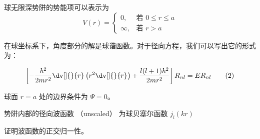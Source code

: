 
\begin{issues}
\issueDraft
\end{issues}


球无限深势阱的势能项可以表示为
$$
V(r)=
\begin{cases}
0,  & \text{若 $0\leq r\leq a$} \\
\infty, & \text{若 $r>a$}
\end{cases}
$$

在球坐标系下，角度部分的解是球谐函数。对于径向方程，我们可以写出它的形式为：

\begin{equation}
\left[-\frac{\hbar^2}{2mr^2} \dv[]{}{r}\left(r^2\dv[]{}{r}\right) + \frac{l(l + 1)\hbar^2}{2mr^2}\right]R_{nl} = ER_{nl}\tag{2}
\end{equation}

球面 $r = a$ 处的边界条件为 $\Psi = 0$。

势阱内部的径向波函数 （unscaled） 为球贝塞尔函数 $j_l(kr)$

证明波函数的正交归一性。
